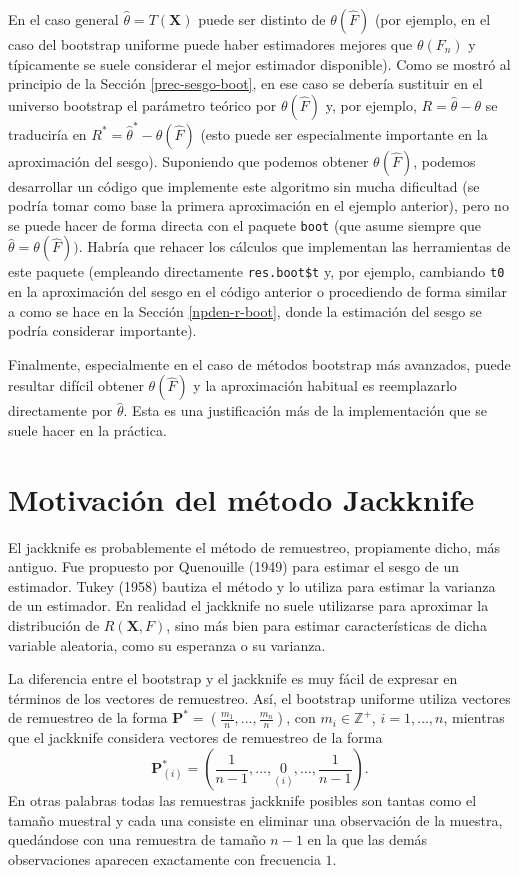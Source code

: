 \documentclass[
]{book}
\renewcommand{\mathbf}[1]{\symbf{#1}}
\theoremstyle{break}
\theoremstyle{nonumberplain}
\begin{document}
En el caso general \(\hat\theta = T\left( \mathbf{X} \right)\) puede ser distinto de \(\theta ( \hat{F} )\) (por ejemplo, en el caso del bootstrap uniforme puede haber estimadores mejores que \(\theta( F_n)\) y típicamente se suele considerar el mejor estimador disponible).
Como se mostró al principio de la Sección \ref{prec-sesgo-boot}, en ese caso se debería sustituir en el universo bootstrap el parámetro teórico por \(\theta ( \hat{F} )\) y, por ejemplo, \(R = \hat \theta - \theta\) se traduciría en \(R^{\ast} = \hat \theta^{\ast} - \theta ( \hat{F} )\) (esto puede ser especialmente importante en la aproximación del sesgo).
Suponiendo que podemos obtener \(\theta ( \hat{F} )\), podemos desarrollar un código que implemente este algoritmo sin mucha dificultad (se podría tomar como base la primera aproximación en el ejemplo anterior), pero no se puede hacer de forma directa con el paquete \texttt{boot} (que asume siempre que \(\hat\theta = \theta ( \hat{F} ))\).
Habría que rehacer los cálculos que implementan las herramientas de este paquete (empleando directamente \texttt{res.boot\$t} y, por ejemplo, cambiando \texttt{t0} en la aproximación del sesgo en el código anterior o procediendo de forma similar a como se hace en la Sección \ref{npden-r-boot}, donde la estimación del sesgo se podría considerar importante).

Finalmente, especialmente en el caso de métodos bootstrap más avanzados, puede resultar difícil obtener \(\theta ( \hat{F} )\) y la aproximación habitual es reemplazarlo directamente por \(\hat \theta\).
Esta es una justificación más de la implementación que se suele hacer en la práctica.

\section{Motivación del método Jackknife}\label{jackknife}

El jackknife es probablemente el método de remuestreo, propiamente
dicho, más antiguo. Fue propuesto por Quenouille (1949) para estimar el
sesgo de un estimador. Tukey (1958) bautiza el método y lo utiliza para
estimar la varianza de un estimador. En realidad el jackknife no suele
utilizarse para aproximar la distribución de \(R\left( \mathbf{X},F \right)\),
sino más bien para estimar características de dicha
variable aleatoria, como su esperanza o su varianza.

La diferencia entre el bootstrap y el jackknife es muy fácil de expresar
en términos de los vectores de remuestreo. Así, el bootstrap uniforme
utiliza vectores de remuestreo de la forma
\(\mathbf{P}^{\ast}=\left( \frac{m_1}{n},\ldots ,\frac{m_n}{n} \right)\), con
\(m_i\in \mathbb{Z}^{+}\), \(i=1,\ldots ,n\), mientras que el jackknife considera
vectores de remuestreo de la forma
\[\mathbf{P}_{(i)}^{\ast}=\left( \frac{1}{n-1},\ldots ,\underset{(i)}{0}
,\ldots ,\frac{1}{n-1} \right).\]
En otras palabras todas las remuestras
jackknife posibles son tantas como el tamaño muestral y cada una
consiste en eliminar una observación de la muestra, quedándose con una
remuestra de tamaño \(n-1\) en la que las demás observaciones aparecen
exactamente con frecuencia \(1\).
\end{document}

